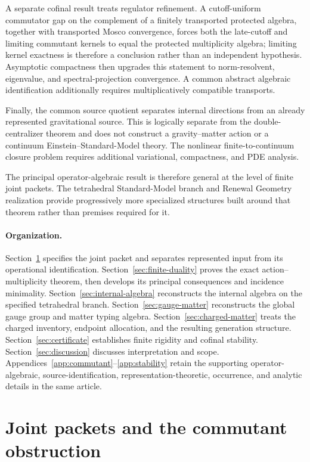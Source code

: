\documentclass[11pt]{article}
\numberwithin{equation}{section}
\theoremstyle{definition}
\theoremstyle{remark}
\begin{document}
A separate cofinal result treats regulator refinement.  A cutoff-uniform
commutator gap on the complement of a finitely transported protected algebra,
together with transported Mosco convergence, forces both the late-cutoff and
limiting commutant kernels to equal the protected multiplicity algebra; limiting
kernel exactness is therefore a conclusion rather than an independent
hypothesis.  Asymptotic compactness then upgrades this statement to
norm-resolvent, eigenvalue, and spectral-projection convergence.  A common
abstract algebraic identification additionally requires multiplicatively
compatible transports.

Finally, the common source quotient separates internal directions from an
already represented gravitational source.  This is logically separate from
the double-centralizer theorem and does not construct a gravity--matter
action or a continuum Einstein--Standard-Model theory.  The nonlinear
finite-to-continuum closure problem requires additional variational,
compactness, and PDE analysis.

The principal operator-algebraic result is therefore general at the level of
finite joint packets.  The tetrahedral Standard-Model branch and Renewal
Geometry realization provide progressively more specialized structures built
around that theorem rather than premises required for it.

\paragraph{Organization.}
Section~\ref{sec:joint-interface} specifies the joint packet and separates
represented input from its operational identification.
Section~\ref{sec:finite-duality} proves the exact action--multiplicity theorem,
then develops its principal consequences and incidence minimality.
Section~\ref{sec:internal-algebra} reconstructs the internal algebra on the
specified tetrahedral branch.
Section~\ref{sec:gauge-matter} reconstructs the global gauge group and matter
typing algebra.  Section~\ref{sec:charged-matter} treats the charged inventory,
endpoint allocation, and the resulting generation structure.
Section~\ref{sec:certificate} establishes finite rigidity and cofinal stability.
Section~\ref{sec:discussion} discusses interpretation and scope.
Appendices~\ref{app:commutant}--\ref{app:stability} retain the supporting
operator-algebraic, source-identification, representation-theoretic,
occurrence, and analytic details in the same article.


\section{Joint packets and the commutant obstruction}
\label{sec:joint-interface}
\end{document}
